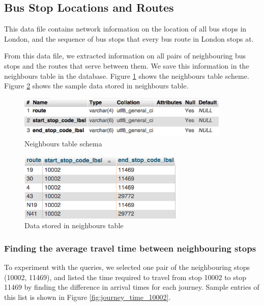 \subsection{Bus Stop Locations and Routes}
\par This data file contains network information on the location of all bus stops in London, and the sequence of bus stops that every bus route in London stops at. 

\par From this data file, we extracted information on all pairs of neighbouring bus stops and the routes that serve between them. We save this information in the neighbours table in the database. Figure \ref{fig:neighbours_schema} shows the neighbours table scheme. Figure \ref{fig:neighbours_view} shows the sample data stored in neighbours table.

\begin{figure}
\centering
\includegraphics[width=0.9\textwidth]{figures/neighbours_schema.png}
\caption{\label{fig:neighbours_schema} Neighbours table schema}
\end{figure}

\begin{figure}
\centering
\includegraphics[width=0.7\textwidth]{figures/neighbours_view.png}
\caption{\label{fig:neighbours_view} Data stored in neighbours table}
\end{figure}

\subsubsection{Finding the average travel time between neighbouring stops}
\par To experiment with the queries, we selected one pair of the neighbouring stops (10002, 11469), and listed the time required to travel from stop 10002 to stop 11469 by finding the difference in arrival times for each journey. Sample entries of this list is shown in Figure \ref{fig:journey_time_10002}.

